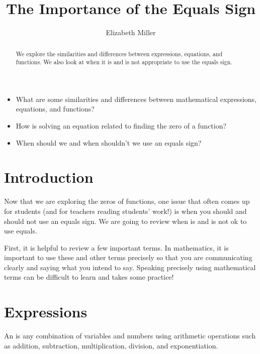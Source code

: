 \documentclass{ximera}
\author{Elizabeth Miller}
\title{The Importance of the Equals Sign}
\begin{document}
\begin{abstract}
 We explore the similarities and differences between expressions, equations, and functions.  We also look at when it is and is not appropriate to use the equals sign.
\end{abstract}
\maketitle



\begin{motivatingQuestions}\begin{itemize}
\item What are some similarities and differences between mathematical expressions, equations, and functions?
\item How is solving an equation related to finding the zero of a function?
\item When should we and when shouldn't we use an equals sign?
\end{itemize}\end{motivatingQuestions}



\section{Introduction}
Now that we are exploring the zeros of functions, one issue that often comes up for students (and for teachers reading students' work!) is when you should and should not use an equals sign.  We are going to review when is and is not ok to use equals.

First, it is helpful to review a few important terms.  In mathematics, it is important to use these and other terms precisely so that you are communicating clearly and saying what you intend to say.  Speaking precisely using mathematical terms can be difficult to learn and takes some practice!

\section{Expressions}

\begin{definition}
An  is any combination of variables and numbers using arithmetic operations such as addition, subtraction, multiplication, division, and exponentiation.
\end{definition}
\end{document}
